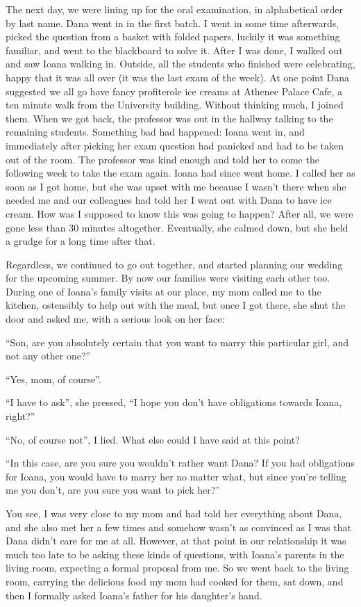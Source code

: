 \documentclass[12pt]{book}
\begin{document}
The next day, we were lining up for the oral examination, in
alphabetical order by last name. Dana went in in the first batch. I went
in some time afterwards, picked the question from a basket with folded
papers, luckily it was something familiar, and went to the blackboard to
solve it. After I was done, I walked out and saw Ioana walking in.
Outside, all the students who finished were celebrating, happy that it
was all over (it was the last exam of the week). At one point Dana
suggested we all go have fancy profiterole ice creams at Athenee Palace
Cafe, a ten minute walk from the University building. Without thinking
much, I joined them. When we got back, the professor was out in the
hallway talking to the remaining students. Something bad had happened:
Ioana went in, and immediately after picking her exam question had
panicked and had to be taken out of the room. The professor was kind
enough and told her to come the following week to take the exam again.
Ioana had since went home. I called her as soon as I got home, but she
was upset with me because I wasn't there when she needed me and our
colleagues had told her I went out with Dana to have ice cream. How was
I supposed to know this was going to happen? After all, we were gone
less than 30 minutes altogether. Eventually, she calmed down, but she
held a grudge for a long time after that.

Regardless, we continued to go out together, and started planning our
wedding for the upcoming summer. By now our families were visiting each
other too. During one of Ioana's family visits at our place, my mom
called me to the kitchen, ostensibly to help out with the meal, but once
I got there, she shut the door and asked me, with a serious look on her
face:

``Son, are you absolutely certain that you want to marry this particular
girl, and not any other one?''

``Yes, mom, of course''.

``I have to ask'', she pressed, ``I hope you don't have obligations
towards Ioana, right?''

``No, of course not'', I lied. What else could I have said at this
point?

``In this case, are you sure you wouldn't rather want Dana? If you had
obligations for Ioana, you would have to marry her no matter what, but
since you're telling me you don't, are you sure you want to pick her?''

You see, I was very close to my mom and had told her everything about
Dana, and she also met her a few times and somehow wasn't as convinced
as I was that Dana didn't care for me at all. However, at that point in
our relationship it was much too late to be asking these kinds of
questions, with Ioana's parents in the living room, expecting a formal
proposal from me. So we went back to the living room, carrying the
delicious food my mom had cooked for them, sat down, and then I formally
asked Ioana's father for his daughter's hand.
\end{document}
